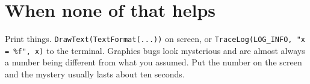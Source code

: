 \section{When none of that helps}

Print things. \lstinline|DrawText(TextFormat(...))| on screen, or
\lstinline|TraceLog(LOG_INFO, "x = %f", x)| to the terminal. Graphics bugs look
mysterious and are almost always a number being different from what you assumed.
Put the number on the screen and the mystery usually lasts about ten seconds.

